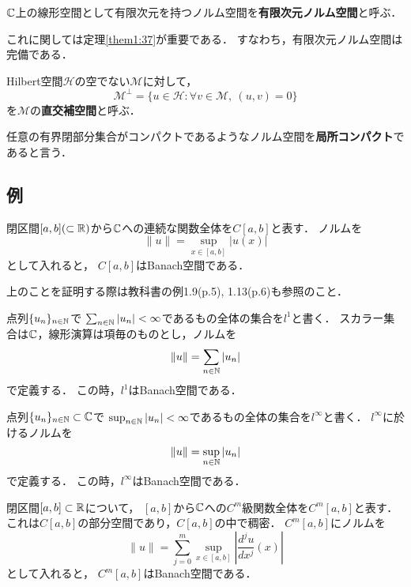 \documentclass[a4j]{jarticle}
\begin{document}
        \begin{Def}
            $\mathbb{C}$上の線形空間として有限次元を持つノルム空間を\textbf{有限次元ノルム空間}と呼ぶ．
        \end{Def}
        これに関しては定理\ref{them1:37}が重要である．
        すなわち，有限次元ノルム空間は完備である．

        \begin{Def}
            Hilbert空間$\mathscr{H}$の空でない$\mathscr{M}$に対して，
            \[ \mathscr{M}^{\perp}=\{ u \in \mathscr{H} : \forall v \in \mathscr{M},~ (u,v)=0\} \]
            を$\mathscr{M}$の\textbf{直交補空間}と呼ぶ．
        \end{Def}

        \begin{Def}
            任意の有界閉部分集合がコンパクトであるようなノルム空間を\textbf{局所コンパクト}であると言う．
        \end{Def}

    \subsection{例}
        \begin{Example}[例1.17, p.8]
            閉区間$[a,b]( \subset \mathbb{R})$から$\mathbb{C}$への連続な関数全体を$C[a,b]$と表す．
            ノルムを\[ \|u\|=\displaystyle{\sup_{x \in [a,b]}{|u(x)|}} \]として入れると，
            $C[a,b]$はBanach空間である．
        \end{Example}
        上のことを証明する際は教科書の例1.9(p.5), 1.13(p.6)も参照のこと．

        \begin{Example}[例1.18, p.9]
            点列$\{u_n\}_{n \in \mathbb{N}}$で
            $\sum_{n \in \mathbb{N}}{|u_n|}<\infty$であるもの全体の集合を$l^1$と書く．
            スカラー集合は$\mathbb{C}$，線形演算は項毎のものとし，ノルムを\[ \|u\|=\sum_{n \in \mathbb{N}}{|u_n|} \]で定義する．
            この時，$l^1$はBanach空間である．
        \end{Example}
        \begin{Example}[例1.19, p.10]
            点列$\{u_n\}_{n \in \mathbb{N}} \subset \mathbb{C}$で
            $\sup_{n \in \mathbb{N}}{|u_n|}<\infty$であるもの全体の集合を$l^{\infty}$と書く．
            $l^{\infty}$に於けるノルムを\[ \|u\|=\sup_{n \in \mathbb{N}}{|u_n|} \]で定義する．
            この時，$l^{\infty}$はBanach空間である．
        \end{Example}
        \begin{Example}[例1.33, p.19]
            閉区間$[a,b] \subset \mathbb{R}$について，
            $[a,b]$から$\mathbb{C}$への$C^m$級関数全体を$C^m[a,b]$と表す．
            これは$C[a,b]$の部分空間であり，$C[a,b]$の中で稠密．
            $C^m[a,b]$にノルムを
            \[ \|u\|=\sum_{j=0}^{m}{ \sup_{x \in [a,b]}{\left| \frac{d^j u}{dx^j}(x) \right|} } \]
            として入れると，
            $C^m[a,b]$はBanach空間である．
        \end{Example}
\end{document}
